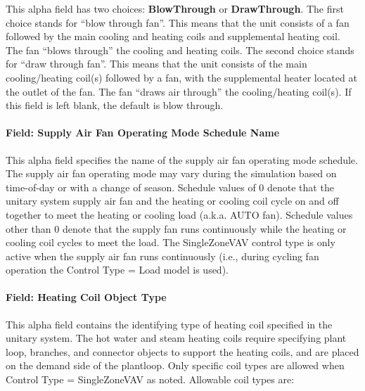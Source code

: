 This alpha field has two choices: \textbf{BlowThrough} or \textbf{DrawThrough}. The first choice stands for ``blow through fan''. This means that the unit consists of a fan followed by the main cooling and heating coils and supplemental heating coil. The fan ``blows through'' the cooling and heating coils. The second choice stands for ``draw through fan''. This means that the unit consists of the main cooling/heating coil(s) followed by a fan, with the supplemental heater located at the outlet of the fan. The fan ``draws air through'' the cooling/heating coil(s). If this field is left blank, the default is blow through.

\paragraph{Field: Supply Air Fan Operating Mode Schedule Name}\label{supply-air-fan-operating-mode-schedule-name}

This alpha field specifies the name of the supply air fan operating mode schedule. The supply air fan operating mode may vary during the simulation based on time-of-day or with a change of season. Schedule values of 0 denote that the unitary system supply air fan and the heating or cooling coil cycle on and off together to meet the heating or cooling load (a.k.a. AUTO fan). Schedule values other than 0 denote that the supply fan runs continuously while the heating or cooling coil cycles to meet the load. The SingleZoneVAV control type is only active when the supply air fan runs continuously (i.e., during cycling fan operation the Control Type = Load model is used).

\paragraph{Field: Heating Coil Object Type}\label{field-heating-coil-object-type-002}

This alpha field contains the identifying type of heating coil specified in the unitary system. The hot water and steam heating coils require specifying plant loop, branches, and connector objects to support the heating coils, and are placed on the demand side of the plantloop. Only specific coil types are allowed when Control Type = SingleZoneVAV as noted. Allowable coil types are:

